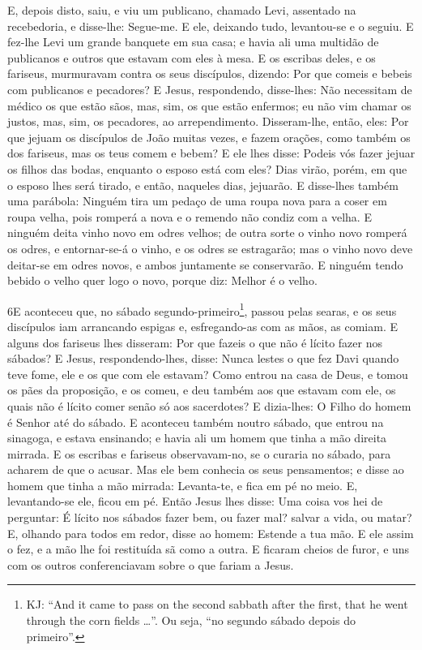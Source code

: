 E, depois disto, saiu, e viu um publicano, chamado Levi,
assentado na recebedoria, e disse-lhe: Segue-me. E ele,
deixando tudo, levantou-se e o seguiu. E fez-lhe Levi um
grande banquete em sua casa; e havia ali uma multidão de publicanos
e outros que estavam com eles à mesa. E os escribas deles, e
os fariseus, murmuravam contra os seus discípulos, dizendo: Por que
comeis e bebeis com publicanos e pecadores? E Jesus,
respondendo, disse-lhes: Não necessitam de médico os que estão sãos,
mas, sim, os que estão enfermos; eu não vim chamar os justos,
mas, sim, os pecadores, ao arrependimento. Disseram-lhe,
então, eles: Por que jejuam os discípulos de João muitas vezes, e
fazem orações, como também os dos fariseus, mas os teus comem e
bebem? E ele lhes disse: Podeis vós fazer jejuar os filhos
das bodas, enquanto o esposo está com eles? Dias virão,
porém, em que o esposo lhes será tirado, e então, naqueles dias,
jejuarão. E disse-lhes também uma parábola: Ninguém tira um
pedaço de uma roupa nova para a coser em roupa velha, pois romperá a
nova e o remendo não condiz com a velha. E ninguém deita
vinho novo em odres velhos; de outra sorte o vinho novo romperá os
odres, e entornar-se-á o vinho, e os odres se estragarão; mas
o vinho novo deve deitar-se em odres novos, e ambos juntamente se
conservarão. E ninguém tendo bebido o velho quer logo o novo,
porque diz: Melhor é o velho.

\medskip

\lettrine{6} E aconteceu que, no sábado
segundo-primeiro\footnote{KJ: ``And it came to pass on the second
sabbath after the first, that he went through the corn fields
\ldots''. Ou seja, ``no segundo sábado depois do primeiro''.},
passou pelas searas, e os seus discípulos iam arrancando espigas e,
esfregando-as com as mãos, as comiam. E alguns dos fariseus lhes
disseram: Por que fazeis o que não é lícito fazer nos sábados? E
Jesus, respondendo-lhes, disse: Nunca lestes o que fez Davi quando
teve fome, ele e os que com ele estavam? Como entrou na casa de
Deus, e tomou os pães da proposição, e os comeu, e deu também aos
que estavam com ele, os quais não é lícito comer senão só aos
sacerdotes? E dizia-lhes: O Filho do homem é Senhor até do
sábado. E aconteceu também noutro sábado, que entrou na
sinagoga, e estava ensinando; e havia ali um homem que tinha a mão
direita mirrada. E os escribas e fariseus observavam-no, se o
curaria no sábado, para acharem de que o acusar. Mas ele bem
conhecia os seus pensamentos; e disse ao homem que tinha a mão
mirrada: Levanta-te, e fica em pé no meio. E, levantando-se ele,
ficou em pé. Então Jesus lhes disse: Uma coisa vos hei de
perguntar: É lícito nos sábados fazer bem, ou fazer mal? salvar a
vida, ou matar? E, olhando para todos em redor, disse ao
homem: Estende a tua mão. E ele assim o fez, e a mão lhe foi
restituída sã como a outra. E ficaram cheios de furor, e uns
com os outros conferenciavam sobre o que fariam a Jesus.

